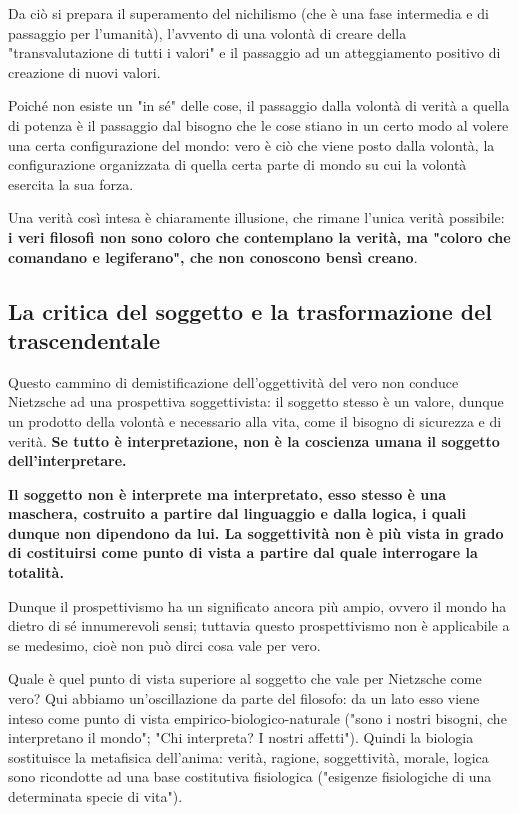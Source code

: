 Da ciò si prepara il superamento del nichilismo (che è una fase intermedia e di passaggio per l'umanità), l'avvento di una volontà di creare della "transvalutazione di tutti i valori" e il passaggio ad un atteggiamento positivo di creazione di nuovi valori.

Poiché non esiste un "in sé" delle cose, il passaggio dalla volontà di verità a quella di potenza è il passaggio dal bisogno che le cose stiano in un certo modo al volere una certa configurazione del mondo: vero è ciò che viene posto dalla volontà, la configurazione organizzata di quella certa parte di mondo su cui la volontà esercita la sua forza.

Una verità così intesa è chiaramente illusione, che rimane l'unica verità possibile: \textbf{i veri filosofi non sono coloro che contemplano la verità, ma "coloro che comandano e legiferano", che non conoscono bensì creano}.

\subsection{La critica del soggetto e la trasformazione del trascendentale}

Questo cammino di demistificazione dell'oggettività del vero non conduce Nietzsche ad una prospettiva soggettivista: il soggetto stesso è un valore, dunque un prodotto della volontà e necessario alla vita, come il bisogno di sicurezza e di verità.\textbf{ Se tutto è interpretazione, non è la coscienza umana il soggetto dell'interpretare.}

\textbf{Il soggetto non è interprete ma interpretato, esso stesso è una maschera, costruito a partire dal linguaggio e dalla logica, i quali dunque non dipendono da lui. La soggettività non è più vista in grado di costituirsi come punto di vista a partire dal quale interrogare la totalità.}

Dunque il prospettivismo ha un significato ancora più ampio, ovvero il mondo ha dietro di sé innumerevoli sensi; tuttavia questo prospettivismo non è applicabile a se medesimo, cioè non può dirci cosa vale per vero.

Quale è quel punto di vista superiore al soggetto che vale per Nietzsche come vero? Qui abbiamo un'oscillazione da parte del filosofo: da un lato esso viene inteso come punto di vista empirico-biologico-naturale ("sono i nostri bisogni, che interpretano il mondo"; "Chi interpreta? I nostri affetti"). Quindi la biologia sostituisce la metafisica dell'anima: verità, ragione, soggettività, morale, logica sono ricondotte ad una base costitutiva fisiologica ("esigenze fisiologiche di una determinata specie di vita").


